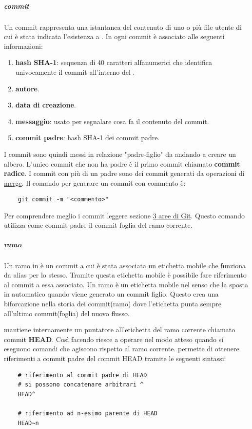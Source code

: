 \subparagraph{commit}
\label{subpar:commit}
Un commit rappresenta una istantanea del contenuto di uno o più file utente di cui è stata indicata l'esistenza a .
In  ogni commit è associato alle seguenti informazioni:
\begin{enumerate}
    \item \textbf{hash SHA-1}: sequenza di 40 caratteri alfanumerici che identifica univocamente il commit all'interno del .
    \item \textbf{autore}.
    \item \textbf{data di creazione}.
    \item \textbf{messaggio}: usato per segnalare cosa fa il contenuto del commit.
    \item \textbf{commit padre}: hash SHA-1 dei commit padre.
\end{enumerate}
I commit sono quindi messi in relazione "padre-figlio" da  andando a creare un albero.
L'unico commit che non ha padre è il primo commit chiamato \textbf{commit radice}.
I commit con più di un padre sono dei commit generati da operazioni di \hyperref[subpar:merge]{merge}.
Il comando  per generare un commit con commento è:
\begin{lstlisting}
    git commit -m "<commento>"
\end{lstlisting}
Per comprendere meglio i commit leggere sezione \hyperref[subpar:3_aree_git]{3 aree di Git}.
Questo comando utilizza come commit padre il commit foglia del ramo corrente. 

\subparagraph{ramo}
\label{subpar:branch}
Un ramo in  è un commit a cui è stata associata un etichetta mobile che funziona da alias per lo stesso.
Tramite questa etichetta mobile è possibile fare riferimento al commit a essa associato.
Un ramo è un etichetta mobile nel senso che  la sposta in automatico quando viene generato un commit figlio.
Questo crea una biforcazione nella storia dei commit(ramo) dove l'etichetta punta sempre all'ultimo commit(foglia) del nuovo flusso.

 mantiene internamente un puntatore all'etichetta del ramo corrente chiamato commit \textbf{HEAD}.
Così facendo riesce a operare nel modo atteso quando si eseguono comandi che agiscono rispetto al ramo corrente.
 permette di ottenere riferimenti a commit padre del commit HEAD tramite le seguenti sintassi:
\begin{lstlisting}
    # riferimento al commit padre di HEAD
    # si possono concatenare arbitrari ^
    HEAD^

    # riferimento ad n-esimo parente di HEAD
    HEAD~n
\end{lstlisting}
 

